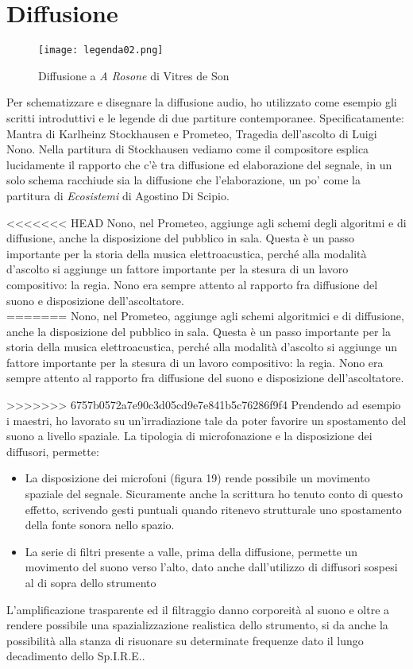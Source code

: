 \section{Diffusione} %

\begin{figure}[htbp]
\begin{center}
\texttt{[image: legenda02.png]}
\caption{Diffusione a \textit{A Rosone} di Vitres de Son}
\label{default}
\end{center}
\end{figure}

Per schematizzare e disegnare la diffusione audio, ho utilizzato come esempio gli scritti introduttivi e le legende di due partiture contemporanee. Specificatamente: Mantra di Karlheinz Stockhausen e Prometeo, Tragedia dell'ascolto di Luigi Nono. Nella partitura di Stockhausen vediamo come il compositore esplica lucidamente il rapporto che c'è tra diffusione ed elaborazione del segnale, in un solo schema racchiude sia la diffusione che l'elaborazione, un po' come la partitura di \textit{Ecosistemi} di Agostino Di Scipio.

<<<<<<< HEAD
Nono, nel Prometeo, aggiunge agli schemi degli algoritmi e di diffusione, anche la disposizione del pubblico in sala. Questa è un passo importante per la storia della musica elettroacustica, perché alla modalità d'ascolto si aggiunge un fattore importante per la stesura di un lavoro compositivo: la regia. Nono era sempre attento al rapporto fra diffusione del suono e disposizione dell'ascoltatore. \\
=======
Nono, nel Prometeo, aggiunge agli schemi algoritmici e di diffusione, anche la disposizione del pubblico in sala. Questa è un passo importante per la storia della musica elettroacustica, perché alla modalità d'ascolto si aggiunge un fattore importante per la stesura di un lavoro compositivo: la regia. Nono era sempre attento al rapporto fra diffusione del suono e disposizione dell'ascoltatore.

>>>>>>> 6757b0572a7e90c3d05cd9e7e841b5c76286f9f4
Prendendo ad esempio i maestri, ho lavorato su un'irradiazione tale da poter favorire un spostamento del suono a livello spaziale. La tipologia di microfonazione e la disposizione dei diffusori, permette:

\begin{itemize}
\item{La disposizione dei microfoni (figura 19) rende possibile un movimento spaziale del segnale. Sicuramente anche la scrittura ho tenuto conto di questo effetto, scrivendo gesti puntuali quando ritenevo strutturale uno spostamento della fonte sonora nello spazio.}
\item{La serie di filtri presente a valle, prima della diffusione, permette un movimento del suono verso l'alto, dato anche dall'utilizzo di diffusori sospesi al di sopra dello strumento}
\end{itemize}

L'amplificazione trasparente ed il filtraggio danno corporeità al suono e oltre a rendere possibile una spazializzazione realistica dello strumento, si da anche la possibilità alla stanza di risuonare su determinate frequenze dato il lungo decadimento dello Sp.I.R.E..
